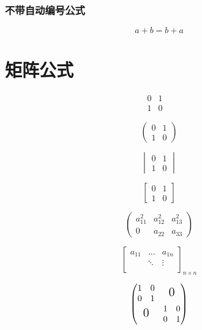 \documentclass{article} %
\begin{document}
    	\subsubsection{不带自动编号公式}
    		\begin{equation*}
    			a+b=b+a
    		\end{equation*} %
    
    
    
    
    
    
    
    \newpage
    \section{矩阵公式}
   		\[
   			\begin{matrix}%
  				0&1\\
  				1&0
			\end{matrix}\quad
		\]

		\[
			\begin{pmatrix}%
 				0&1\\
				1&0
			\end{pmatrix}
		\]	

		\[
			\begin{vmatrix}%
				0&1\\
				1&0
			\end{vmatrix}
		\]

		\[
			\begin{bmatrix}%
				0&1\\
				1&0
			\end{bmatrix}
		\]


		\[
			\begin{pmatrix}%
				a_{11}^2&a_{12}^2&a_{13}^2\\
				0&a_{22}&a_{33}
			\end{pmatrix}
		\]

		\[
			\begin{bmatrix}%
				a_{11}&\dots&a_{1n}\\
				&\ddots&\vdots\\
			\end{bmatrix}_{n \times n} %
		\]

		\[
			\begin{pmatrix}%
				\begin{matrix}
					1&0\\0&1
				\end{matrix}
				& \text{\Large 0}\\
				
				\text{\Large 0}&
				\begin{matrix}
					1&0\\0&1
				\end{matrix}
			\end{pmatrix}
		\]
\end{document}
